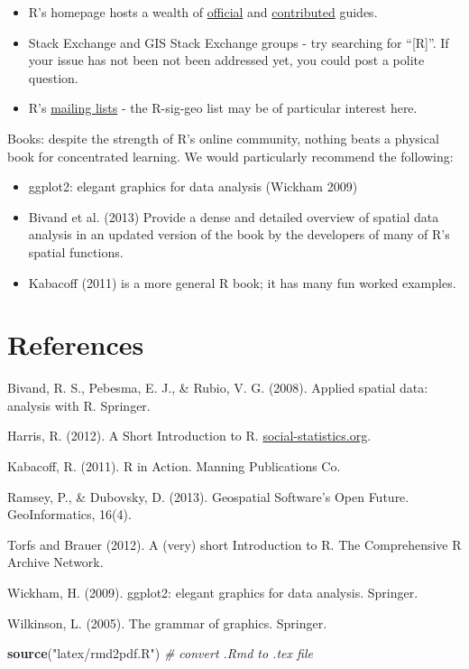 \documentclass[]{article}
\newenvironment{Shaded}{}{}
\newcommand{\KeywordTok}[1]{\textcolor[rgb]{0.00,0.44,0.13}{\textbf{{#1}}}}
\newcommand{\StringTok}[1]{\textcolor[rgb]{0.25,0.44,0.63}{{#1}}}
\newcommand{\CommentTok}[1]{\textcolor[rgb]{0.38,0.63,0.69}{\textit{{#1}}}}
\newcommand{\NormalTok}[1]{{#1}}
\begin{document}
\begin{itemize}
\item
  R's homepage hosts a wealth of
  \href{http://cran.r-project.org/manuals.html}{official} and
  \href{http://cran.r-project.org/other-docs.html}{contributed} guides.
\item
  Stack Exchange and GIS Stack Exchange groups - try searching for
  ``{[}R{]}''. If your issue has not been not been addressed yet, you
  could post a polite question.
\item
  R's \href{http://www.r-project.org/mail.html}{mailing lists} - the
  R-sig-geo list may be of particular interest here.
\end{itemize}
Books: despite the strength of R's online community, nothing beats a
physical book for concentrated learning. We would particularly recommend
the following:

\begin{itemize}
\item
  ggplot2: elegant graphics for data analysis (Wickham 2009)
\item
  Bivand et al. (2013) Provide a dense and detailed overview of spatial
  data analysis in an updated version of the book by the developers of
  many of R's spatial functions.
\item
  Kabacoff (2011) is a more general R book; it has many fun worked
  examples.
\end{itemize}
\newpage \section{References}

Bivand, R. S., Pebesma, E. J., \& Rubio, V. G. (2008). Applied spatial
data: analysis with R. Springer.

Harris, R. (2012). A Short Introduction to R.
\href{http://www.social-statistics.org/}{social-statistics.org}.

Kabacoff, R. (2011). R in Action. Manning Publications Co.

Ramsey, P., \& Dubovsky, D. (2013). Geospatial Software's Open Future.
GeoInformatics, 16(4).

Torfs and Brauer (2012). A (very) short Introduction to R. The
Comprehensive R Archive Network.

Wickham, H. (2009). ggplot2: elegant graphics for data analysis.
Springer.

Wilkinson, L. (2005). The grammar of graphics. Springer.

\begin{Shaded}
\begin{Highlighting}[]
\KeywordTok{source}\NormalTok{(}\StringTok{"latex/rmd2pdf.R"}\NormalTok{)  }\CommentTok{# convert .Rmd to .tex file}
\end{Highlighting}
\end{Shaded}
\end{document}
